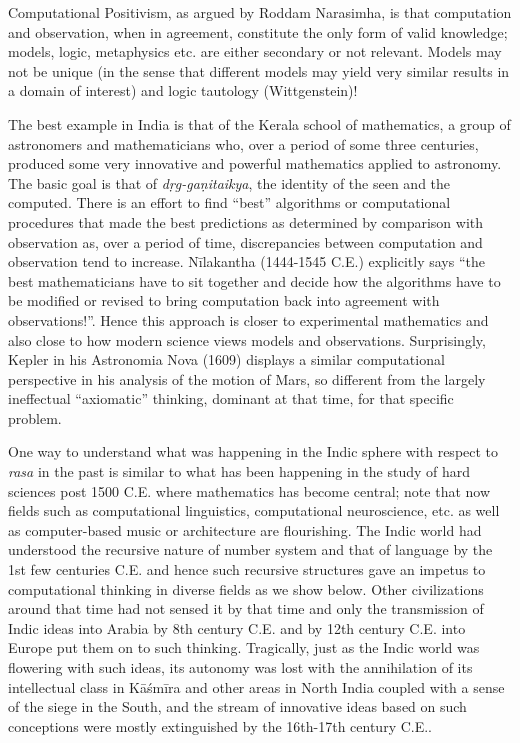 Computational Positivism, as argued by Roddam Narasimha, is that computation and observation, when in agreement, constitute the only form of valid knowledge; models, logic, metaphysics etc. are either secondary or not relevant. Models may not be unique (in the sense that different models may yield very similar results in a domain of interest) and logic tautology (Wittgenstein)!

The best example in India is that of the Kerala school of mathematics, a group of astronomers and mathematicians who, over a period of some three centuries, produced some very innovative and powerful mathematics applied to astronomy. The basic goal is that of \textsl{dṛg-gaṇitaikya}, the identity of the seen and the computed. There is an effort to find “best” algorithms or computational procedures that made the best predictions as determined by comparison with observation as, over a period of time, discrepancies between computation and observation tend to increase. Nīlakantha (1444-1545 C.E.) explicitly says “the best mathematicians have to sit together and decide how the algorithms have to be modified or revised to bring computation back into agreement with observations!”. Hence this approach is closer to experimental mathematics and also close to how modern science views models and observations. Surprisingly, Kepler in his Astronomia Nova (1609) displays a similar computational perspective in his analysis of the motion of Mars, so different from the largely ineffectual “axiomatic” thinking, dominant at that time, for that specific problem.

One way to understand what was happening in the Indic sphere with respect to \textsl{rasa} in the past is similar to what has been happening in the study of hard sciences post 1500 C.E. where mathematics has become central; note that now fields such as computational linguistics, computational neuroscience, etc. as well as computer-based music or architecture are flourishing. The Indic world had understood the recursive nature of number system and that of language by the 1st few centuries C.E. and hence such recursive structures gave an impetus to computational thinking in diverse fields as we show below. Other civilizations around that time had not sensed it by that time and only the transmission of Indic ideas into Arabia by 8th century C.E. and by 12th century C.E. into Europe put them on to such thinking. Tragically, just as the Indic world was flowering with such ideas, its autonomy was lost with the annihilation of its intellectual class in Kāśmīra and other areas in North India coupled with a sense of the siege in the South, and the stream of innovative ideas based on such conceptions were mostly extinguished by the 16th-17th century C.E..

